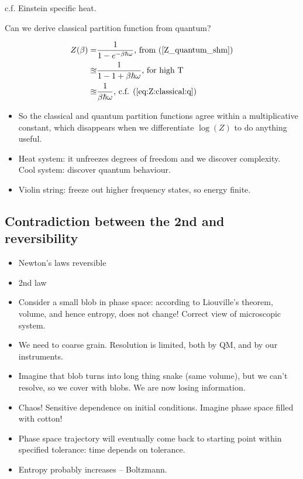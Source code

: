 \documentclass[]{article}
\begin{document}
c.f. Einstein specific heat.

Can we derive classical partition function from quantum?

\begin{align*}
Z(\beta) =&  \frac{1}{1 - e^{- \beta\hbar \omega}} \text{, from (\ref {Z_quantum_shm})}\\
\approxeq & \frac{1}{1 - 1 + \beta\hbar \omega}\text{, for high T}\\
\approxeq & \frac{1}{\beta\hbar \omega}\text{, c.f. (\ref{eq:Z:classical:q})}
\end{align*}

\begin{itemize}
	\item So the classical and quantum partition functions agree within a multiplicative constant, which disappears when we differentiate $\log(Z)$ to do anything useful.
	\item Heat system: it unfreezes degrees of freedom and we discover complexity. Cool system: discover quantum behaviour.
	\item Violin string: freeze out higher frequency states, so energy finite.
\end{itemize}

\subsection{Contradiction between the 2nd and reversibility}
\begin{itemize}
	\item Newton's laws reversible
	\item 2nd law
	\item Consider a small blob in phase space: according to Liouville's theorem, volume, and hence entropy, does not change! Correct view of microscopic system.
	\item We need to coarse grain. Resolution is limited, both by QM, and by our instruments.
	\item Imagine that blob turns into long thing snake (same volume), but we can't resolve, so we cover with blobs. We are now losing information. 
	\item Chaos! Sensitive dependence on initial conditions. Imagine phase space filled with cotton!
	
	\item Phase space trajectory will eventually come back to starting point within specified tolerance: time depends on tolerance.
	
	\item Entropy probably increases -- Boltzmann. 
\end{itemize}
\end{document}
